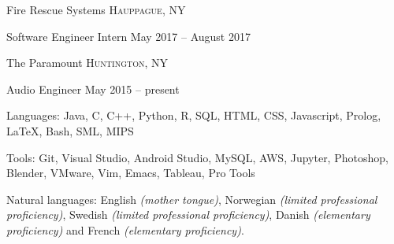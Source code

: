 \documentclass[10pt,letterpaper]{article} %
\begin{document}
\headedsection 
{Fire Rescue Systems}
{\textsc{Hauppague, NY}} {

\headedsubsection
{Software Engineer Intern}
{May 2017 -- August 2017}
{}
}


\headedsection 
{The Paramount}
{\textsc{Huntington, NY}} {

\headedsubsection 
{Audio Engineer}
{May 2015 -- present}
{}
}


\spacedhrule{0em}{-0.9em} 



\inlineheadsection 
{Languages:}
{Java, C, C++, Python, R, SQL, HTML, CSS, Javascript, Prolog, {\LaTeX}, Bash, SML, MIPS}


\inlineheadsection 
{Tools:}
{Git, Visual Studio, Android Studio, MySQL, AWS, Jupyter, Photoshop, Blender, VMware, Vim, Emacs, Tableau, Pro Tools}


\inlineheadsection 
{Natural languages:}
{English \textit{(mother tongue)}, Norwegian \textit{(limited professional proficiency)}, Swedish \textit{(limited professional proficiency)}, Danish \textit{(elementary proficiency)} and French \textit{(elementary proficiency)}.}

\end{document}

